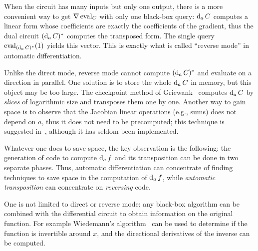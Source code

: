 When the circuit has many inputs but only one output, there is a more
convenient way to get $\nabla \operatorname{eval}_C$ with only one black-box query:
$\operatorname{d}_aC$ computes a linear form whose coefficients are exactly the
coefficients of the gradient, thus the dual circuit
$(\operatorname{d}_aC)^\ast$ computes the transposed form. The single query
$\operatorname{eval}_{(\operatorname{d}_aC)^\ast}(1)$ yields this vector. This is exactly
what is called ``reverse mode'' in automatic differentiation. 

\begin{remark}
  Unlike the direct mode, reverse mode cannot compute
  $(\operatorname{d}_aC)^\ast$ and evaluate on a direction in parallel. One
  solution is to store the whole $\operatorname{d}_aC$ in memory, but this object
  may be too large. The checkpoint method of
  Griewank~\cite{griewank92} computes $\operatorname{d}_aC$ by \emph{slices} of
  logarithmic size and transposes them one by one. Another way to gain
  space is to observe that the Jacobian linear operations (e.g., sums)
  does not depend on $a$, thus it does not need to be precomputed;
  this technique is suggested in~\cite{gilbert+levey+masse91},
  although it has seldom been implemented.

  Whatever one does to save space, the key observation is the
  following: the generation of code to compute $\operatorname{d}_a f$ and its
  transposition can be done in two separate phases. Thus, automatic
  differentiation can concentrate of finding techniques to save space
  in the computation of $\operatorname{d}_a f$, while
  \emph{automatic transposition} can
  concentrate on \emph{reversing} code.
\end{remark}

\begin{nota}
  One is not limited to direct or reverse mode: any black-box
  algorithm can be combined with the differential circuit to obtain
  information on the original function. For example Wiedemann's
  algorithm~\cite{wiedemann:sparse} can be used to determine if the
  function is invertible around $x$, and the directional derivatives
  of the inverse can be computed.
\end{nota}




%
